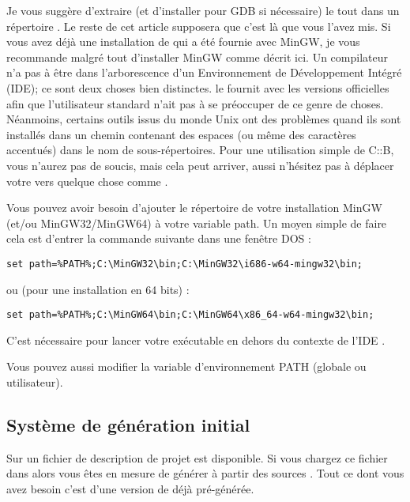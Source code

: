 Je vous suggère d'extraire (et d'installer pour GDB si nécessaire) le tout dans un répertoire . Le reste de cet article supposera que c'est là que vous l'avez mis. Si vous avez déjà une installation de \codeblocks qui a été fournie avec MinGW, je vous recommande malgré tout d'installer MinGW comme décrit ici. Un compilateur n'a pas à être dans l'arborescence d'un Environnement de Développement Intégré (IDE); ce sont deux choses bien distinctes. \codeblocks le fournit avec les versions officielles afin que l'utilisateur standard n'ait pas à se préoccuper de ce genre de choses. Néanmoins, certains outils issus du monde Unix ont des problèmes quand ils sont installés dans un chemin contenant des espaces (ou même des caractères accentués) dans le nom de sous-répertoires. Pour une utilisation simple de C::B, vous n'aurez pas de soucis, mais cela peut arriver, aussi n'hésitez pas à déplacer votre  vers quelque chose comme .

Vous pouvez avoir besoin d'ajouter le répertoire  de votre installation MinGW (et/ou MinGW32/MinGW64) à votre variable path. Un moyen simple de faire cela est d'entrer la commande suivante dans une fenêtre DOS :

\begin{verbatim}
set path=%PATH%;C:\MinGW32\bin;C:\MinGW32\i686-w64-mingw32\bin;
\end{verbatim}
ou (pour une installation en 64 bits) :
\begin{verbatim}
set path=%PATH%;C:\MinGW64\bin;C:\MinGW64\x86_64-w64-mingw32\bin;
\end{verbatim}

C'est nécessaire pour lancer votre exécutable en dehors du contexte de l'IDE \codeblocks.

Vous pouvez aussi modifier la variable d'environnement PATH (globale ou utilisateur).


\subsection{Système de génération initial}

Sur \href{https://www.codeblocks.org/}{\codeblocks} un fichier de description de projet  est disponible. Si vous chargez ce fichier dans \codeblocks alors vous êtes en mesure de générer \codeblocks à partir des sources \cite{url:cb}. Tout ce dont vous avez besoin c'est d'une version de \codeblocks déjà pré-générée.

